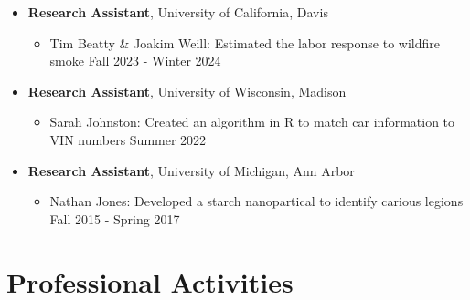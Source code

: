 \documentclass{article}[12]
\begin{document}
\begin{itemize}[itemsep=0.5em]
    
    \item \textbf{Research Assistant}, University of California, Davis
    \begin{itemize}
        \item Tim Beatty \& Joakim Weill: Estimated the labor response to wildfire smoke \hfill Fall 2023 - Winter 2024 

    \end{itemize}

    \item \textbf{Research Assistant}, University of Wisconsin, Madison
    \begin{itemize}
        \item Sarah Johnston: Created an algorithm in R to match car information to VIN numbers \hfill Summer 2022
    \end{itemize}

    \item \textbf{Research Assistant}, University of Michigan, Ann Arbor
    \begin{itemize}
        \item Nathan Jones: Developed a starch nanopartical to identify carious legions \hfill Fall 2015 - Spring 2017
    \end{itemize}
  
\end{itemize}

\section{Professional Activities}
\end{document}
